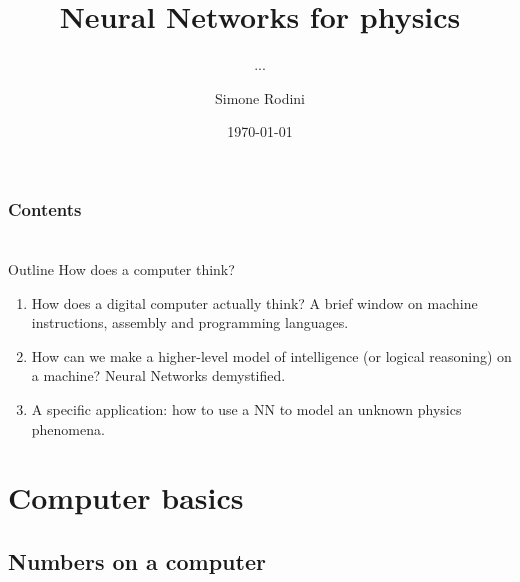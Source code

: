 \documentclass[10pt]{beamer}
\title{Neural Networks for physics}
\subtitle{...}
\author[S. Rodini]{Simone Rodini}
\date[\today]{\today}
\renewcommand{\[}{\begin{equation*}}
\renewcommand{\]}{\end{equation*}}
\begin{document}
\frame{\titlepage}
\begin{frame}
\frametitle{Contents}
\tableofcontents
\end{frame}
\section{}
\begin{frame}{Outline}
How does a computer think? 
\begin{enumerate}
\item How does a digital computer actually think? A brief window on machine instructions, assembly and programming languages.
\item How can we make a higher-level model of intelligence (or logical reasoning) on a machine? Neural Networks demystified.
\item A specific application: how to use a NN to model an unknown physics phenomena.
\end{enumerate}
\end{frame}

\section{Computer basics}
\subsection{Numbers on a computer}
\end{document}
